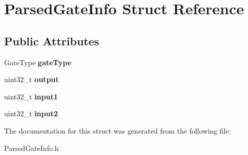 \hypertarget{structParsedGateInfo}{}\section{Parsed\+Gate\+Info Struct Reference}
\label{structParsedGateInfo}
\subsection*{Public Attributes}
\begin{DoxyCompactItemize}
\item 
Gate\+Type {\bfseries gate\+Type}\hypertarget{structParsedGateInfo_a514bcd3e8895d2b4b79babee5dcd82ef}{}\label{structParsedGateInfo_a514bcd3e8895d2b4b79babee5dcd82ef}

\item 
uint32\+\_\+t {\bfseries output}\hypertarget{structParsedGateInfo_a1b1c7eb7a1273b7c212c54ee41c5f307}{}\label{structParsedGateInfo_a1b1c7eb7a1273b7c212c54ee41c5f307}

\item 
uint32\+\_\+t {\bfseries input1}\hypertarget{structParsedGateInfo_a71d56d324e35cf2c4201e0fb3f30e277}{}\label{structParsedGateInfo_a71d56d324e35cf2c4201e0fb3f30e277}

\item 
uint32\+\_\+t {\bfseries input2}\hypertarget{structParsedGateInfo_ace5809dcc3babac4f15b79ea667da859}{}\label{structParsedGateInfo_ace5809dcc3babac4f15b79ea667da859}

\end{DoxyCompactItemize}


The documentation for this struct was generated from the following file\+:\begin{DoxyCompactItemize}
\item 
Parsed\+Gate\+Info.\+h\end{DoxyCompactItemize}
